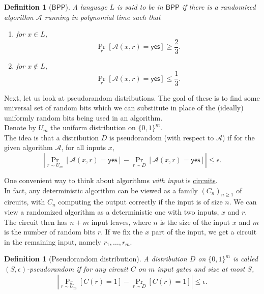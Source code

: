 \documentclass{article}
\newtheorem{definition}[theorem]{Definition}
\newcommand{\BPP}{\mathsf{BPP}}
\begin{document}
	\begin{definition}[$\BPP$]
		A language $L$ is said to be in $\BPP$ if there is a randomized algorithm $\mathcal{A}$ running in polynomial time such that
		\begin{enumerate}
			\item for $x \in L$,
			\[ \Pr_{r} \left[\mathcal{A}(x,r) = \mathsf{yes}\right] \ge \frac{2}{3}. \]
			\item for $x \not\in L$,
			\[ \Pr_{r} \left[\mathcal{A}(x,r) = \mathsf{yes}\right] \le \frac{1}{3}. \]
		\end{enumerate}
	\end{definition}
	

	Next, let us look at pseudorandom distributions. The goal of these is to find some universal set of random bits which we can substitute in place of the (ideally) uniformly random bits being used in an algorithm. \\
	Denote by $U_m$ the uniform distribution on $\{0,1\}^m$.\\
	The idea is that a distribution $D$ is pseudorandom (with respect to $\mathcal{A}$) if for the given algorithm $\mathcal{A}$, for all inputs $x$,
	\[ \left| \Pr_{r \sim U_m}[ \mathcal{A}(x,r) = \mathsf{yes}] - \Pr_{r \sim D}[ \mathcal{A}(x,r) = \mathsf{yes} ] \right| \le \epsilon. \]

	One convenient way to think about algorithms \emph{with input} is \href{https://en.wikipedia.org/wiki/Boolean_circuit}{circuits}.\\
	In fact, any deterministic algorithm can be viewed as a family $(C_n)_{n \ge 1}$ of circuits, with $C_n$ computing the output correctly if the input is of size $n$. We can view a randomized algorithm as a deterministic one with two inputs, $x$ and $r$. The circuit then has $n+m$ input leaves, where $n$ is the size of the input $x$ and $m$ is the number of random bits $r$. If we fix the $x$ part of the input, we get a circuit in the remaining input, namely $r_1,\ldots,r_m$.

	\begin{definition}[Pseudorandom distribution]
		A distribution $D$ on $\{0,1\}^m$ is called \emph{$(S,\epsilon)$-pseudorandom} if for any circuit $C$ on $m$ input gates and size at most $S$,
		\[ \left| \Pr_{r \sim U_m} [ C(r) = 1 ] - \Pr_{r \sim D} [C(r) = 1] \right| \le \epsilon. \]
	\end{definition}
\end{document}
